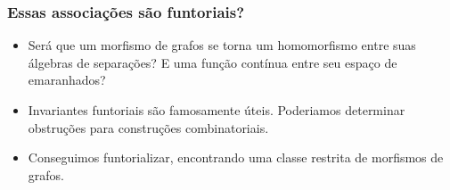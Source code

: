 \begin{frame}[fragile]
\frametitle{Essas associações são funtoriais?}
\begin{center}
\end{center} \pause 

\begin{itemize}



\item Será que um morfismo de grafos se torna um homomorfismo entre suas álgebras de separações? E uma função contínua entre seu espaço de emaranhados? \pause


\item Invariantes funtoriais são famosamente úteis. Poderiamos determinar obstruções para construções combinatoriais. \pause

\item Conseguimos funtorializar, encontrando uma classe restrita de morfismos de grafos.
\end{itemize}
\end{frame}

